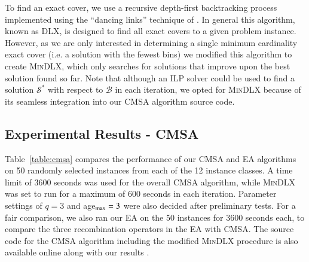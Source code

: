 \documentclass[a4paper,11pt,authoryear]{elsarticle}
\newcommand{\rev}[1]{{\color{myRed}#1}}
\begin{document}
\noindent To find an exact cover, we use a recursive depth-first backtracking process implemented using the ``dancing links'' technique of \cite{knuth2000}. In general this algorithm, known as DLX, is designed to find all exact covers to a given problem instance. However, as we are only interested in determining a single minimum cardinality exact cover (i.e. a solution with the fewest bins) we modified this algorithm to create \textsc{MinDLX}, which only searches for solutions that improve upon the best solution found so far. \rev{Note that although an ILP solver could be used to find a solution $\mathcal{S}^*$ with respect to $\mathcal{B}$ in each iteration, we opted for \textsc{MinDLX} because of its seamless integration into our CMSA algorithm source code.}

\subsection{Experimental Results - CMSA}
\label{sub:expcmsa}

\noindent Table~\ref{table:cmsa} compares the performance of our CMSA and EA algorithms on 50 randomly selected instances from each of the 12 instance classes. A time limit of 3600 seconds was used for the overall CMSA algorithm, while \textsc{MinDLX} was set to run for a maximum of 600 seconds in each iteration. Parameter settings of $q = 3$ and age$_{\textup{max}} = 3$ were also decided after preliminary tests. For a fair comparison, we also ran our EA on the 50 instances for 3600 seconds each, to compare the three recombination operators in the EA with CMSA. The source code for the CMSA algorithm including the modified \textsc{MinDLX} procedure is also available online along with our results \citep{hawa2019cmsa}.
\end{document}
